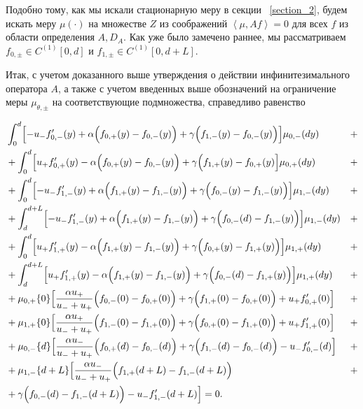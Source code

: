 \documentclass[12pt,a4paper]{article}
\begin{document}
Подобно тому, как мы искали стационарную меру в секции ~\eqref{section_2}, будем искать меру $\mu ( \cdot)$ на множестве $Z$ из соображений $\left< \mu, A f\right> = 0$ для всех $f$ из области определения $A, D_A$. Как уже было замечено раннее, мы рассматриваем $f_{0, \pm} \in C^{(1)} [0, d]$ и $f_{1, \pm} \in C^{(1)} [0, d + L]$.

Итак, с учетом доказанного выше утверждения о действии инфинитезимального оператора $A$, а также с учетом введенных выше обозначений на ограничение меры $\mu_{\theta, \pm}$ на соответствующие подмножества, справедливо равенство

\begin{equation}\label{main_eq}
    \begin{aligned}
    &\int_0^d \Bigl[-u_- f_{0,-}' (y) + \alpha \Bigl(f_{0,+}(y) - f_{0,-}(y) \Bigr) + \gamma \Bigl(f_{1,-} (y) - f_{0,-} (y) \Bigr) \Bigr] \mu_{0,-} (dy) &+ \\
    &+ \int_0^d \Bigl[u_+ f_{0,+}' (y) - \alpha \Bigl(f_{0,+}(y) - f_{0,-}(y) \Bigr) + \gamma \Bigl(f_{1,+} (y) - f_{0,+} (y) \Bigr] \mu_{0,+} (dy) &+ \\
    &+ \int_0^d \Bigl[-u_- f_{1,-}' (y) + \alpha \Bigl(f_{1,+}(y) - f_{1,-}(y) \Bigr) + \gamma \Bigl(f_{0,-} (y) - f_{1,-} (y) \Bigr) \Bigr] \mu_{1,-} (dy) &+ \\
    &+ \int_d^{d + L} \Bigl[-u_- f_{1,-}' (y) + \alpha \Bigl(f_{1,+}(y) - f_{1,-}(y) \Bigr) + \gamma \Bigl(f_{0,-} (d) - f_{1,-} (y) \Bigr) \Bigr] \mu_{1,-} (dy) &+ \\
    &+ \int_0^{d} \Bigl[u_+ f_{1,+}' (y) - \alpha \Bigl(f_{1,+}(y) - f_{1,-}(y) \Bigr) + \gamma \Bigl(f_{0,+} (y) - f_{1,+} (y) \Bigr) \Bigr] \mu_{1,+} (dy) &+ \\
    &+ \int_d^{d + L} \Bigl[u_+ f_{1,+}' (y) - \alpha \Bigl(f_{1,+}(y) - f_{1,-}(y) \Bigr) + \gamma \Bigl(f_{0,-} (d) - f_{1,+} (y) \Bigr) \Bigr] \mu_{1,+} (dy) &+ \\
 &+ \mu_{0,+} \{0\} \Bigl[\frac{\alpha u_+}{u_- + u_+} \Bigl(f_{0,-} (0) - f_{0,+} (0)\Bigr) + \gamma \Bigl( f_{1,+} (0) - f_{0,+} (0) \Bigr) + u_+ f_{0,+}' (0) \Bigr]  &+ \\
 &+ \mu_{1,+} \{0\} \Bigl[\frac{\alpha u_+}{u_- + u_+} \Bigl(f_{1,-} (0) - f_{1,+} (0)\Bigr) + \gamma \Bigl( f_{0,+} (0) - f_{1,+} (0) \Bigr) + u_+ f_{1,+}' (0) \Bigr]  &+ \\
 &+ \mu_{0,-} \{d\} \Bigl[\frac{\alpha u_-}{u_- + u_+} \Bigl(f_{0,+} (d) - f_{0,-} (d)\Bigr) + \gamma \Bigl( f_{1,-} (d) - f_{0,-} (d) \Bigr) - u_- f_{0,-}' (d) \Bigr]  &+ \\
 &+ \mu_{1,-} \{d + L\} \Bigl[\frac{\alpha u_-}{u_- + u_+} \Bigl(f_{1,+} (d + L) - f_{1,-} (d + L)\Bigr) &+ \\
 &+ \gamma \Bigl( f_{0,-} (d) - f_{1,-} (d + L) \Bigr) - u_- f_{1,-}' (d + L) \Bigr]  = 0.
    \end{aligned}
\end{equation}
\end{document}
